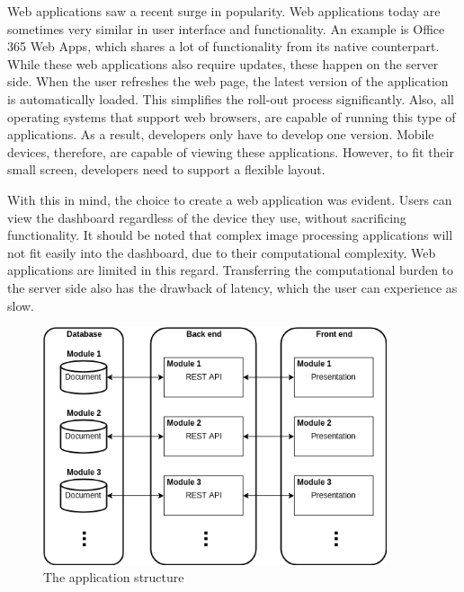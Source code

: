     Web applications saw a recent surge in popularity. Web applications today are sometimes very similar in user interface and functionality. An example is Office 365 Web Apps, which shares a lot of functionality from its native counterpart. While these web applications also require updates, these happen on the server side. When the user refreshes the web page, the latest version of the application is automatically loaded. This simplifies the roll-out process significantly. Also, all operating systems that support web browsers, are capable of running this type of applications. As a result, developers only have to develop one version. Mobile devices, therefore, are capable of viewing these applications. However, to fit their small screen, developers need to support a flexible layout.

    With this in mind, the choice to create a web application was evident. Users can view the dashboard regardless of the device they use, without sacrificing functionality. It should be noted that complex image processing applications will not fit easily into the dashboard, due to their computational complexity. Web applications are limited in this regard. Transferring the computational burden to the server side also has the drawback of latency, which the user can experience as slow.

    \begin{figure}[!t]
        \centering
        \includegraphics[width=0.9\textwidth]{chapters/4_implementation/structure}
        \caption{The application structure}\label{fig:structure}
    \end{figure}


